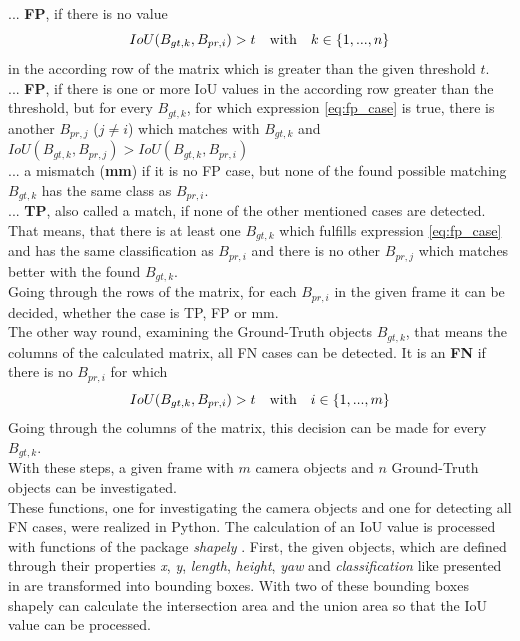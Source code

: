 ... \textbf{FP}, if there is no value 
\begin{equation}
	IoU(B_{gt,k}, B_{pr,i}) > t \text{\quad with\quad} k \in \left\lbrace 1, ..., n\right\rbrace 
	\label{eq:fp_case}
\end{equation}
in the according row of the matrix which is greater than the given threshold $t$. \\

... \textbf{FP}, if there is one or more IoU values in the according row greater than the threshold, but for every $B_{gt,k}$, for which expression \ref{eq:fp_case} is true, there is another $B_{pr,j}$ ($j\neq i$) which matches with $B_{gt,k}$ and $IoU(B_{gt,k}, B_{pr,j}) > IoU(B_{gt,k}, B_{pr,i})$ \\

... a mismatch (\textbf{mm}) if it is no FP case, but none of the found possible matching $B_{gt,k}$ has the same class as $B_{pr,i}$. \\

... \textbf{TP}, also called a match, if none of the other mentioned cases are detected. That means, that there is at least one $B_{gt,k}$ which fulfills expression \ref{eq:fp_case} and has the same classification as $B_{pr,i}$ and there is no other $B_{pr,j}$ which matches better with the found $B_{gt,k}$. \\

Going through the rows of the matrix, for each $B_{pr,i}$ in the given frame it can be decided, whether the case is TP, FP or mm. \\

The other way round, examining the Ground-Truth objects $B_{gt,k}$, that means the columns of the calculated matrix, all FN cases can be detected. It is an \textbf{FN} if there is no $B_{pr,i}$ for which
\begin{equation}
	IoU(B_{gt,k}, B_{pr,i}) > t \text{\quad with\quad} i \in \left\lbrace 1, ..., m\right\rbrace 
	\label{eq:fn_case}
\end{equation}
Going through the columns of the matrix, this decision can be made for every $B_{gt,k}$. \\
With these steps, a given frame with $m$ camera objects and $n$ Ground-Truth objects can be investigated. \\

These functions, one for investigating the camera objects and one for detecting all FN cases, were realized in Python. The calculation of an IoU value is processed with functions of the package \textit{shapely} \cite{Shapely}.
First, the given objects, which are defined through their properties \textit{x}, \textit{y}, \textit{length}, \textit{height}, \textit{yaw} and \textit{classification} like presented in \cite{Aeberhard}
are transformed into bounding boxes. With two of these bounding boxes shapely can calculate the intersection area and the union area so that the IoU value can be processed. \\

